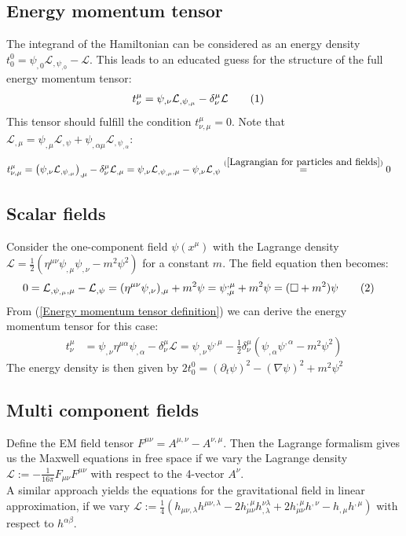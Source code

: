 \documentclass[a4paper,12pt]{article}
\newcommand\numberthis{\addtocounter{equation}{1}\tag{\theequation}}
\newcommand{\kla}{}
\begin{document}
\subsection{Energy momentum tensor}
The integrand of the Hamiltonian can be considered as an energy density $t^0_0=\psi_{,0}\mathcal{L}_{,\psi_{,0}}-\mathcal{L}$. This leads to an educated guess for the structure of the full energy momentum tensor:
\begin{align*}
t^\mu_\nu&=\psi_{,\nu}\mathcal{L}_{,\psi_{,\mu}}-\delta^\mu_\nu\mathcal{L}\numberthis\label{Energy momentum tensor definition}
\end{align*}
This tensor should fulfill the condition $t^\mu_{\nu,\mu}=0$. Note that $\mathcal{L}_{,\mu}=\psi_{,\mu}\mathcal{L}_{,\psi}+\psi_{,\alpha\mu}\mathcal{L}_{,\psi_{,\alpha}}$:
\begin{align*}
t^\mu_{\nu,\mu}&=\kla\left( {\psi_{,\nu}\mathcal{L}_{,\psi_{,\mu}}} \right)_{,\mu}-\delta^\mu_\nu\mathcal{L}_{,\mu}=\psi_{,\nu}\mathcal{L}_{,\psi_{,\mu},\mu}-\psi_{,\nu}\mathcal{L}_{,\psi}\overset{(\ref{Lagrangian for particles and fields})}{=}0
\end{align*}
\subsection{Scalar fields}
Consider the one-component field $\psi(x^\mu)$ with the Lagrange density $\mathcal{L}=\frac{1}{2}\kla\left( {\eta^{\mu\nu}\psi_{,\mu}\psi_{,\nu}-m^2\psi^2} \right)$ for a constant $m$. The field equation then becomes:
\begin{align*}
0&=\mathcal{L}_{,\psi_{,\mu},\mu}-\mathcal{L}_{,\psi}=(\eta^{\mu\nu}\psi_{,\nu})_{,\mu}+m^2\psi=\psi^{,\mu}_{,\mu}+m^2\psi=(\square +m^2)\psi\numberthis\label{Klein Gordon equation}
\end{align*}
From (\ref{Energy momentum tensor definition}) we can derive the energy momentum tensor for this case:
\begin{align*}
t^\mu_\nu&=\psi_{,\nu}\eta^{\mu\alpha}\psi_{,\alpha}-\delta^\mu_\nu\mathcal{L}=\psi_{,\nu}\psi^{,\mu}-\frac{1}{2}\delta^\mu_\nu\kla\left( {\psi_{,\alpha}\psi^{,\alpha}-m^2\psi^2} \right)
\end{align*}
The energy density is then given by $2t^0_0=(\partial_t\psi)^2-(\nabla\psi)^2+m^2\psi^2$
\subsection{Multi component fields}
Define the EM field tensor $F^{\mu\nu}=A^{\mu,\nu}-A^{\nu,\mu}$. Then the Lagrange formalism gives us the Maxwell equations in free space if we vary the Lagrange density $\mathcal{L}:=-\frac{1}{16\pi}F_{\mu\nu}F^{\mu\nu}$ with respect to the 4-vector $A^\nu$.\\
A similar approach yields the equations for the gravitational field in linear approximation, if we vary $\mathcal{L}:=\frac{1}{4}\kla\left( h_{\mu\nu,\lambda}h^{\mu\nu,\lambda}-2h^{,\mu}_{\mu\nu}h^{\nu\lambda}_{,\lambda}+2h^{,\mu}_{\mu\nu}h^{,\nu}-h_{,\mu}h^{,\mu} \right)$ with respect to $h^{\alpha\beta}$.
\end{document}
